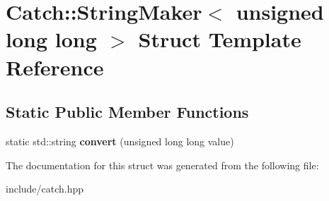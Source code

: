 \hypertarget{structCatch_1_1StringMaker_3_01unsigned_01long_01long_01_4}{}\section{Catch\+:\+:String\+Maker$<$ unsigned long long $>$ Struct Template Reference}
\label{structCatch_1_1StringMaker_3_01unsigned_01long_01long_01_4}
\subsection*{Static Public Member Functions}
\begin{DoxyCompactItemize}
\item 
static std\+::string {\bfseries convert} (unsigned long long value)\hypertarget{structCatch_1_1StringMaker_3_01unsigned_01long_01long_01_4_a6a8708af4fc8df3f52d7eab779b6bc6f}{}\label{structCatch_1_1StringMaker_3_01unsigned_01long_01long_01_4_a6a8708af4fc8df3f52d7eab779b6bc6f}

\end{DoxyCompactItemize}


The documentation for this struct was generated from the following file\+:\begin{DoxyCompactItemize}
\item 
include/catch.\+hpp\end{DoxyCompactItemize}
